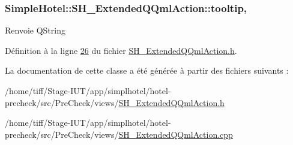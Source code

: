 \hypertarget{classSimpleHotel_1_1SH__ExtendedQQmlAction_a740949c3e220c7d4f34e9dcbd7690646}{
\subsubsection[{tooltip}]{\setlength{\rightskip}{0pt plus 5cm}Simple\-Hotel\-::\-S\-H\-\_\-\-Extended\-Q\-Qml\-Action\-::tooltip\hspace{0.3cm}{\ttfamily [read]}, {\ttfamily [write]}}}\label{classSimpleHotel_1_1SH__ExtendedQQmlAction_a740949c3e220c7d4f34e9dcbd7690646}
\begin{DoxyReturn}{Renvoie}
Q\-String 
\end{DoxyReturn}


Définition à la ligne \hyperlink{SH__ExtendedQQmlAction_8h_source_l00026}{26} du fichier \hyperlink{SH__ExtendedQQmlAction_8h_source}{S\-H\-\_\-\-Extended\-Q\-Qml\-Action.\-h}.



La documentation de cette classe a été générée à partir des fichiers suivants \-:\begin{DoxyCompactItemize}
\item 
/home/tiff/\-Stage-\/\-I\-U\-T/app/simplhotel/hotel-\/precheck/src/\-Pre\-Check/views/\hyperlink{SH__ExtendedQQmlAction_8h}{S\-H\-\_\-\-Extended\-Q\-Qml\-Action.\-h}\item 
/home/tiff/\-Stage-\/\-I\-U\-T/app/simplhotel/hotel-\/precheck/src/\-Pre\-Check/views/\hyperlink{SH__ExtendedQQmlAction_8cpp}{S\-H\-\_\-\-Extended\-Q\-Qml\-Action.\-cpp}\end{DoxyCompactItemize}
